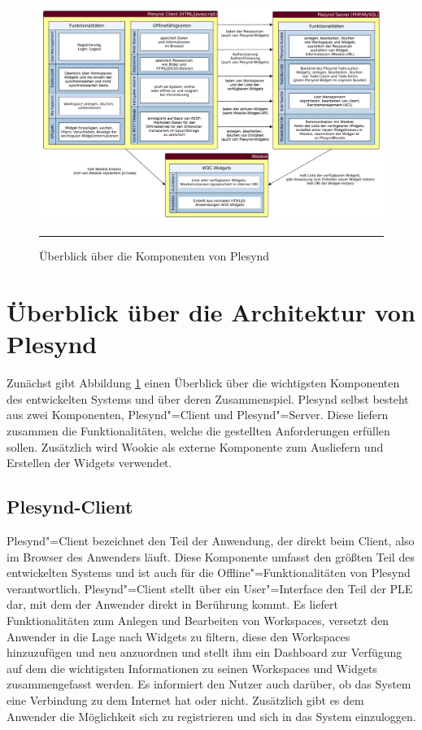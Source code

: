 \begin{landscape}
\begin{figure}
  \centering
  \includegraphics[height=\textheight,keepaspectratio]{./Figures/konzeptionelle_loesung_table.pdf}
    \rule{35em}{0.5pt}
  \caption[Überblick über die Komponenten von Plesynd]{Überblick über die Komponenten von Plesynd}
  \label{fig:ueberblick_plesynd_komponenten}
\end{figure}
\end{landscape}

\section{Überblick über die Architektur von Plesynd}\label{section:plesynd_architektur}
Zunächst gibt Abbildung \ref{fig:ueberblick_plesynd_komponenten} einen Überblick über die wichtigsten Komponenten des entwickelten Systems und über deren Zusammenspiel. Plesynd selbst besteht aus zwei Komponenten, Plesynd"=Client und Plesynd"=Server. Diese liefern zusammen die Funktionalitäten, welche die gestellten Anforderungen erfüllen sollen. Zusätzlich wird Wookie als externe Komponente zum Ausliefern und Erstellen der Widgets verwendet.

\subsection{Plesynd-Client}
Plesynd"=Client bezeichnet den Teil der Anwendung, der direkt beim Client, also im Browser des Anwenders läuft. Diese Komponente umfasst den größten Teil des entwickelten Systems und ist auch für die Offline"=Funktionalitäten von Plesynd verantwortlich. Plesynd"=Client stellt über ein User"=Interface den Teil der PLE dar, mit dem der Anwender direkt in Berührung kommt. Es liefert Funktionalitäten zum Anlegen und Bearbeiten von Workspaces, versetzt den Anwender in die Lage nach Widgets zu filtern, diese den Workspaces hinzuzufügen und neu anzuordnen und stellt ihm ein Dashboard zur Verfügung auf dem die wichtigsten Informationen zu seinen Workspaces und Widgets zusammengefasst werden. Es informiert den Nutzer auch darüber, ob das System eine Verbindung zu dem Internet hat oder nicht. Zusätzlich gibt es dem Anwender die Möglichkeit sich zu registrieren und sich in das System einzuloggen. 

